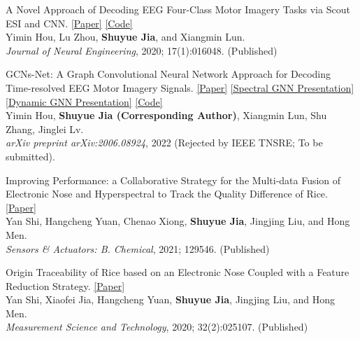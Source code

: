 \documentclass{my_cv}
\begin{document}
\hspace*{\fill}

\workitemsone
{A Novel Approach of Decoding EEG Four-Class Motor Imagery Tasks via Scout ESI and CNN. \href{https://iopscience.iop.org/article/10.1088/1741-2552/ab4af6/meta}{[Paper]} \href{https://github.com/SuperBruceJia/EEG-Motor-Imagery-Classification-CNNs-TensorFlow}{[Code]}\\
	Yimin Hou, Lu Zhou, \textbf{Shuyue Jia}, and Xiangmin Lun. \\
	\emph{Journal of Neural Engineering}, 2020; 17(1):016048. (Published)
}

\hspace*{\fill}

\workitemsone
{GCNs-Net: A Graph Convolutional Neural Network Approach for Decoding Time-resolved EEG Motor Imagery Signals. \href{https://arxiv.org/abs/2006.08924}{[Paper]} \href{https://shuyuej.com/files/GCNs-Net.pdf}{[Spectral GNN Presentation]} \href{https://shuyuej.com/files/Dynamic-GCN-Survey.pdf}{[Dynamic GNN Presentation]} \href{https://github.com/SuperBruceJia/EEG-DL}{[Code]}\\
	Yimin Hou, \textbf{Shuyue Jia (Corresponding Author)}, Xiangmin Lun, Shu Zhang, Jinglei Lv. \\
	\emph{arXiv preprint arXiv:2006.08924}, 2022 (Rejected by IEEE TNSRE; To be submitted).
}

\hspace*{\fill} 

\workitemsone
{Improving Performance: a Collaborative Strategy for the Multi-data Fusion of Electronic Nose and Hyperspectral to Track the Quality Difference of Rice. \href{https://www.sciencedirect.com/science/article/abs/pii/S0925400521001143}{[Paper]} \\
	Yan Shi, Hangcheng Yuan, Chenao Xiong, \textbf{Shuyue Jia}, Jingjing Liu, and Hong Men.\\
	\emph{Sensors \& Actuators: B. Chemical}, 2021; 129546. (Published)
}
	
\hspace*{\fill}

\workitemsone
{Origin Traceability of Rice based on an Electronic Nose Coupled with a Feature Reduction Strategy. \href{https://iopscience.iop.org/article/10.1088/1361-6501/abb9e7/meta}{[Paper]} \\
	Yan Shi, Xiaofei Jia, Hangcheng Yuan, \textbf{Shuyue Jia}, Jingjing Liu, and Hong Men.\\
	\emph{Measurement Science and Technology}, 2020; 32(2):025107. (Published)
}
	
\end{document}
